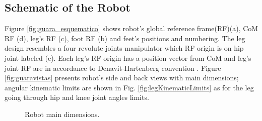 \subsection{Schematic of the Robot}
Figure \ref{fig:guara_esquematico} shows robot's global reference frame(RF)(a), CoM RF (d), leg's RF (c), foot RF (b) and feet's positions and numbering. The leg design resembles a four revolute joints manipulator which RF origin is on hip joint labeled (c). Each leg's RF origin has a position vector from CoM and leg's joint RF are in accordance to Denavit-Hartenberg convention \cite{spong_robot_2006}. 
Figure \ref{fig:guaravistas} presents robot's side and back views with main dimensions; angular kinematic limits are shown in Fig. \ref{fig:legKinematicLimits} as for the leg going through hip and knee joint angles limits.   
\begin{figure}[t]
	\centering
	\caption{Robot main dimensions.}
\end{figure}

